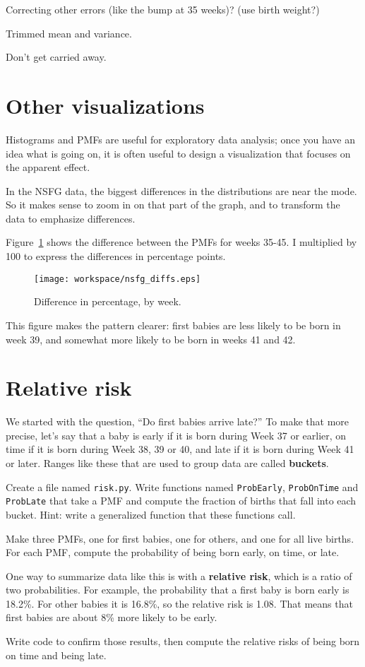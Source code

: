 \documentclass[10pt]{book}
\begin{document}
Correcting other errors (like the bump at 35 weeks)?
   (use birth weight?)

Trimmed mean and variance.

Don't get carried away.


\section{Other visualizations}

Histograms and PMFs are useful for exploratory data analysis;
once you have an idea what is going on, it is often useful to
design a visualization that focuses on the apparent effect.

In the NSFG data, the biggest differences in the distributions are
near the mode.  So it makes sense to zoom in on that part of the
graph, and to transform the data to emphasize differences.

Figure~\ref{nsfg_diffs} shows the difference between the PMFs for weeks
35-45.  I multiplied by 100 to express the differences in percentage
points.

\begin{figure}
\centerline{\texttt{[image: workspace/nsfg\_diffs.eps]}}
\caption{Difference in percentage, by week.}
\label{nsfg_diffs}
\end{figure}

This figure makes the pattern clearer: first babies are
less likely to be born in week 39, and somewhat more likely
to be born in weeks 41 and 42.


\section{Relative risk}

We started with the question, ``Do first babies arrive late?''  To
make that more precise, let's say that a baby is early if it is born
during Week 37 or earlier, on time if it is born during Week 38, 39 or
40, and late if it is born during Week 41 or later.  Ranges like these
that are used to group data are called {\bf buckets}.

\begin{ex}

Create a file named {\tt risk.py}.
Write functions named {\tt ProbEarly}, {\tt ProbOnTime} and
{\tt ProbLate} that take a PMF and compute the fraction of births
that fall into each bucket.  Hint: write a generalized function
that these functions call.

Make three PMFs, one for first babies, one for others, and one for
all live births.  For each PMF, compute the probability of being
born early, on time, or late.

One way to summarize data like this is with a {\bf relative risk},
which is a ratio of two probabilities.  For example, the probability
that a first baby is born early is 18.2\%.  For other babies it is
16.8\%, so the relative risk is 1.08.  That means that first babies
are about 8\% more likely to be early.

Write code to confirm those results, then compute the relative risks of
being born on time and being late.

\end{ex}
\end{document}
